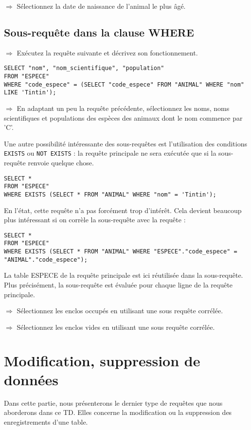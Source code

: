 \documentclass[11pt]{article}
\begin{document}
				$\Rightarrow$ Sélectionnez la date de naissance de l'animal le plus âgé.
				
				
			\subsection{Sous-requête dans la clause WHERE}
				$\Rightarrow$ Exécutez la requête suivante et décrivez son fonctionnement.
				\begin{lstlisting}
SELECT "nom", "nom_scientifique", "population" 
FROM "ESPECE" 
WHERE "code_espece" = (SELECT "code_espece" FROM "ANIMAL" WHERE "nom" LIKE 'Tintin');
				\end{lstlisting}
				
				$\Rightarrow$ En adaptant un peu la requête précédente, sélectionnez les noms, noms scientifiques et populations des espèces des animaux dont le nom commence par 'C'.
				
				Une autre possibilité intéressante des sous-requêtes est l'utilisation des conditions \lstinline{EXISTS} ou \lstinline{NOT EXISTS} : la requête principale ne sera exécutée que si la sous-requête renvoie quelque chose.
				\begin{lstlisting}
SELECT * 
FROM "ESPECE" 
WHERE EXISTS (SELECT * FROM "ANIMAL" WHERE "nom" = 'Tintin');
				\end{lstlisting}
				
				En l'état, cette requête n'a pas forcément trop d'intérêt. Cela devient beaucoup plus intéressant si on corrèle la sous-requête avec la requête :
				\begin{lstlisting}
SELECT * 
FROM "ESPECE" 
WHERE EXISTS (SELECT * FROM "ANIMAL" WHERE "ESPECE"."code_espece" = "ANIMAL"."code_espece");
				\end{lstlisting}
				
				La table ESPECE de la requête principale est ici réutilisée dans la sous-requête. Plus précisément, la sous-requête est évaluée pour chaque ligne de la requête principale.
				
				$\Rightarrow$ Sélectionnez les enclos occupés en utilisant une sous requête corrélée.
				
				$\Rightarrow$ Sélectionnez les enclos vides en utilisant une sous requête corrélée.
				
				
				
		\section{Modification, suppression de données}
			Dans cette partie, nous présenterons le dernier type de requêtes que nous aborderons dans ce TD. Elles concerne la modification ou la suppression des enregistrements d'une table.
			
\end{document}

